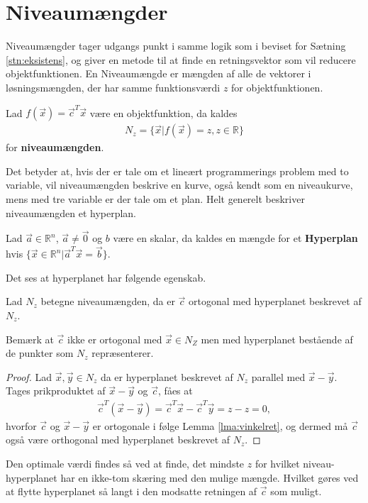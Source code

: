 \section{Niveaumængder}
Niveaumængder tager udgangs punkt i samme logik som i beviset for Sætning \ref{stn:eksistens}, og giver en metode til at finde en retningsvektor som vil reducere objektfunktionen.
En Niveaumængde er mængden af alle de vektorer i løsningsmængden, der har samme funktionsværdi $z$ for objektfunktionen.
\begin{defn}[Niveaumængden]
Lad $f(\vec{x})= \vec{c}^T\vec{x}$ være en objektfunktion, da kaldes
\begin{align*}
N_z = \{\vec{x}| f(\vec{x}) = z, z \in \mathds{R}\}
\end{align*}
for \textbf{niveaumængden}.
\end{defn}
Det betyder at, hvis der er tale om et lineært programmerings problem med to variable, vil niveaumængden beskrive en kurve, også kendt som en niveaukurve, mens med tre variable er der tale om et plan. 
Helt generelt beskriver niveaumængden et hyperplan.
\begin{defn}[Hyperplan]
Lad $ \vec{a} \in \mathds{R}^n$, $\vec{a}\neq \vec{0}$ og $b$ være en skalar, da kaldes en mængde for et \textbf{Hyperplan} hvis $\{ \vec{x} \in \mathds{R}^n | \vec{a}^{T}\vec{x} = \vec{b}\}$.
\end{defn}
Det ses at hyperplanet har følgende egenskab.
\begin{stn}
Lad $N_z$ betegne niveaumængden, da er $\vec{c}$ ortogonal med hyperplanet beskrevet af $N_z$.
\end{stn}
Bemærk at $\vec{c}$ ikke er ortogonal med $\vec{x}\in N_Z$ men med hyperplanet bestående af de punkter som $N_z$ repræsenterer.
\begin{proof}
Lad $\vec{x}, \vec{y} \in N_z$ da er hyperplanet beskrevet af $N_z$ parallel med $\vec{x}-\vec{y}$.
Tages prikproduktet af $\vec{x}-\vec{y}$ og $\vec{c}$, fåes at
\begin{align*}
\vec{c}^T(\vec{x}-\vec{y}) = \vec{c}^T\vec{x} -\vec{c}^T\vec{y} = z - z = 0,
\end{align*}
hvorfor $\vec{c}$ og $\vec{x}-\vec{y}$ er ortogonale i følge Lemma \ref{lma:vinkelret}, og dermed må $\vec{c}$ også være orthogonal med hyperplanet beskrevet af $N_z$.
\end{proof}
Den optimale værdi findes så ved at finde, det mindste $z$ for hvilket niveau-hyperplanet har en ikke-tom skæring med den mulige mængde. 
Hvilket gøres ved at flytte hyperplanet så langt i den modsatte retningen af $\vec{c}$ som muligt.
